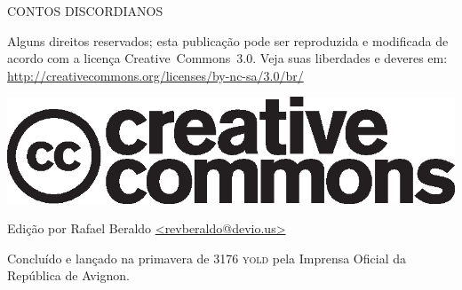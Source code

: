 \thispagestyle{empty}
\begin{center}
{\tiny
CONTOS DISCORDIANOS

\vspace{.5cm}

\begin{minipage}[h]{.6\textwidth}
Alguns direitos reservados; esta publicação pode ser reproduzida e modificada de acordo com a licença \foreignlanguage{english}{Creative~Commons~3.0}. Veja suas liberdades e deveres em: \url{http://creativecommons.org/licenses/by-nc-sa/3.0/br/}
	\begin{center}
	\includegraphics[scale=.2]{cc.eps}
	\end{center}
\end{minipage}

\vspace{.5cm}

\begin{minipage}[h]{.6\textwidth}
Edição por Rafael Beraldo \url{<revberaldo@devio.us>}
\end{minipage}

\vfill

\begin{minipage}[h]{.6\textwidth}
Concluído e lançado na primavera de 3176 \textsc{yold} pela Imprensa Oficial da República de Avignon.
\end{minipage}
}
\end{center}

\newpage
